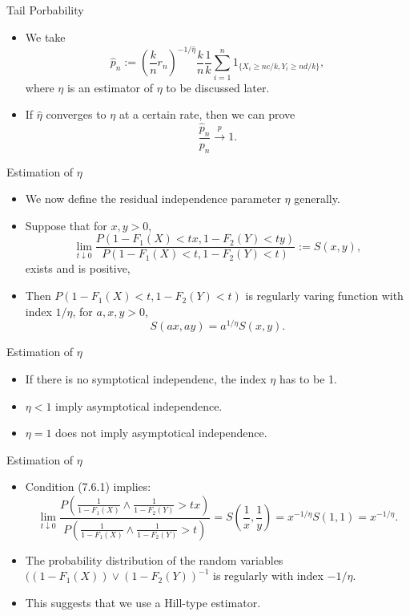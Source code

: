 \documentclass[11pt]{beamer}
\begin{document}
\begin{frame}{Tail Porbability}
\begin{itemize}
\item We take
\begin{displaymath}
\hat{p}_n:=(\frac{k}{n}r_n)^{-1/\hat{\eta}}\frac{k}{n}\frac{1}{k}\sum_{i=1}^n 1_{\{ X_i\ge nc/k, Y_i\ge nd/k\}}, 
\end{displaymath}
where $\eta$ is an estimator of $\eta$ to be discussed later.
\item If $\hat{\eta}$ converges to $\eta$ at a certain rate, then we can prove
\begin{displaymath}
\frac{\hat{p}_n}{p_n}\stackrel{p}{\to}1.
\end{displaymath}

\end{itemize}
\end{frame}
\begin{frame}{Estimation of $\eta$}
\begin{itemize}
\item We now define the residual independence parameter $\eta$ generally.
\item Suppose that for $x,y>0$,
\begin{equation}
\lim_{t\downarrow 0} \dfrac{P(1-F_1(X)<tx, 1-F_2(Y)<ty)}{P(1-F_1(X)<t, 1-F_2(Y)<t)}:=S(x,y), \tag{7.6.1}
\end{equation}
exists and is positive,
\item Then $P(1-F_1(X)<t, 1-F_2(Y)<t)$ is regularly varing function with index $1/\eta$, for $a,x,y>0$,
\begin{displaymath}
S(ax,ay)=a^{1/\eta}S(x,y).
\end{displaymath}
\end{itemize}
\end{frame}

\begin{frame}{Estimation of $\eta$}
\begin{itemize}
\item If there is no  symptotical independenc, the index $\eta$ has to be 1.
\item $\eta<1$ imply asymptotical independence.
\item $\eta=1$ does not imply asymptotical independence. 
\end{itemize}
\end{frame}

\begin{frame}{Estimation of $\eta$}
\begin{itemize}
\item Condition (7.6.1) implies:
\begin{displaymath}
\lim_{t\downarrow 0}\dfrac{ P( \frac{1}{1-F_1(X)}\land \frac{1}{1-F_2(Y)}>tx)}{P(\frac{1}{1-F_1(X)}\land \frac{1}{1-F_2(Y)}>t )} =S(\frac{1}{x},\frac{1}{y})=x^{-1/\eta}S(1,1)=x^{-1/\eta}.
\end{displaymath} 
\item The probability distribution of the random variables $((1-F_1(X))\lor (1-F_2(Y))^{-1}$ is regularly with index $-1/\eta$.
\item This suggests that we use a Hill-type estimator.
\end{itemize}
\end{frame}
\end{document}
